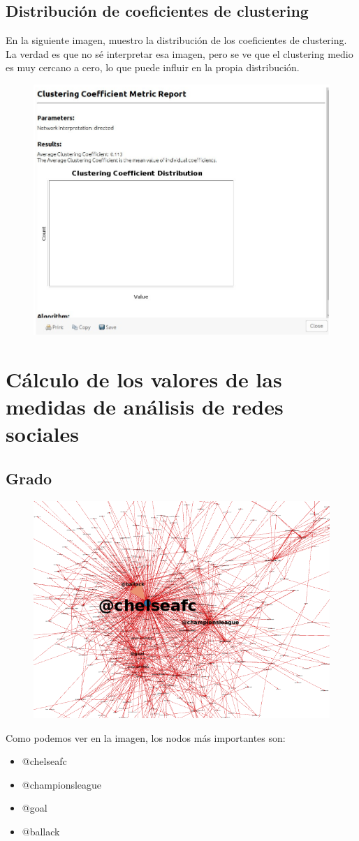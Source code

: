\subsection{Distribución de coeficientes de clustering}

En la siguiente imagen, muestro la distribución de los coeficientes de clustering. La verdad es que no sé interpretar esa imagen, pero se ve que el clustering medio es muy cercano a cero, lo que puede influir en la propia distribución.

\begin{figure}[H]
	\centering
	\includegraphics[width=0.5\linewidth]{Imagenes/screenshot009}
\end{figure}



\section{Cálculo de los valores de las medidas de análisis de redes sociales}
\subsection{Grado}
\begin{figure}[H]
	\centering
	\includegraphics[width=0.6\linewidth]{Imagenes/screenshot010}
\end{figure}

Como podemos ver en la imagen, los nodos más importantes son:
\begin{itemize}
	\item @chelseafc
	\item @championsleague
	\item @goal
	\item @ballack
\end{itemize}
